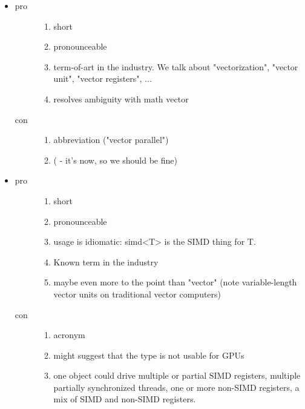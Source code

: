 \begin{itemize}
  \item {}
    \begin{description}
      \item[pro]
        \begin{enumerate}
          \item short
          \item pronounceable
          \item term-of-art in the industry. We talk about "vectorization", "vector unit", "vector registers", ...
          \item resolves ambiguity with math vector
        \end{enumerate}
      \item[con]
        \begin{enumerate}
          \item abbreviation ("vector parallel")
          \item ( - it's  now, so we should be fine)
        \end{enumerate}
    \end{description}

  \item {}
    \begin{description}
      \item[pro]
        \begin{enumerate}
          \item short
          \item pronounceable
          \item usage is idiomatic: simd<T> is the SIMD thing for T.
          \item Known term in the industry
          \item maybe even more to the point than "vector" (note variable-length vector units on traditional vector computers)
        \end{enumerate}
      \item[con]
        \begin{enumerate}
          \item acronym
          \item might suggest that the type is not usable for GPUs
          \item one  object could drive multiple or partial SIMD registers, multiple partially synchronized threads, one or more non-SIMD registers, a mix of SIMD and non-SIMD registers.
        \end{enumerate}
    \end{description}


\end{itemize}
